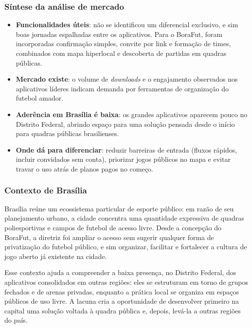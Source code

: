         \subsubsection*{Síntese da análise de mercado}
            \begin{itemize}
                \item \textbf{Funcionalidades úteis}: não se identificou um diferencial exclusivo, e sim boas jornadas espalhadas entre os aplicativos. Para o BoraFut, foram incorporadas confirmação simples, convite por link e formação de times, combinados com mapa hiperlocal e descoberta de partidas em quadras públicas.
                \item \textbf{Mercado existe}: o volume de \textit{downloads} e o engajamento observados nos aplicativos líderes indicam demanda por ferramentas de organização do futebol amador.
                \item \textbf{Aderência em Brasília é baixa}: os grandes aplicativos aparecem pouco no Distrito Federal, abrindo espaço para uma solução pensada desde o início para quadras públicas brasilienses.
                \item \textbf{Onde dá para diferenciar}: reduzir barreiras de entrada (fluxos rápidos, incluir convidados sem conta), priorizar jogos públicos no mapa e evitar travar o uso atrás de planos pagos no começo.
            \end{itemize}

        \subsubsection*{Contexto de Brasília}
            Brasília reúne um ecossistema particular de esporte público: em razão de seu planejamento urbano, a cidade concentra uma quantidade expressiva de quadras poliesportivas e campos de futebol de acesso livre. Desde a concepção do BoraFut, a diretriz foi ampliar o acesso sem sugerir qualquer forma de privatização do futebol público, e sim organizar, facilitar e fortalecer a cultura de jogo aberto já existente na cidade.

            Esse contexto ajuda a compreender a baixa presença, no Distrito Federal, dos aplicativos consolidados em outras regiões: eles se estruturam em torno de grupos fechados e de arenas privadas, enquanto a prática local se organiza em espaços públicos de uso livre. A lacuna cria a oportunidade de desenvolver primeiro na capital uma solução voltada à quadra pública e, depois, levá-la a outras regiões do país.

